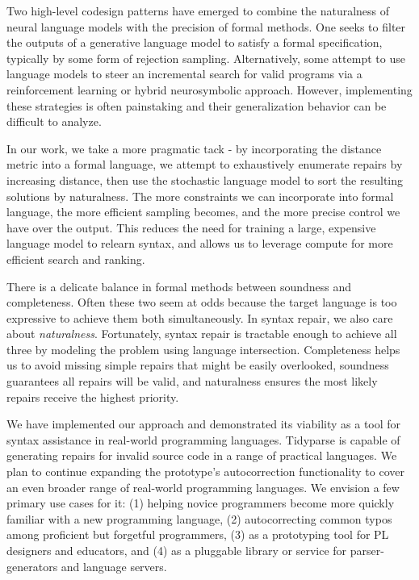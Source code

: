 \documentclass[sigplan,review,acmsmall,nonacm,screen,anonymous]{acmart}\settopmatter{printfolios=false,printccs=false,printacmref=false}
\begin{document}
Two high-level codesign patterns have emerged to combine the naturalness of neural language models with the precision of formal methods. One seeks to filter the outputs of a generative language model to satisfy a formal specification, typically by some form of rejection sampling. Alternatively, some attempt to use language models to steer an incremental search for valid programs via a reinforcement learning or hybrid neurosymbolic approach. However, implementing these strategies is often painstaking and their generalization behavior can be difficult to analyze.

In our work, we take a more pragmatic tack - by incorporating the distance metric into a formal language, we attempt to exhaustively enumerate repairs by increasing distance, then use the stochastic language model to sort the resulting solutions by naturalness. The more constraints we can incorporate into formal language, the more efficient sampling becomes, and the more precise control we have over the output. This reduces the need for training a large, expensive language model to relearn syntax, and allows us to leverage compute for more efficient search and ranking.

There is a delicate balance in formal methods between soundness and completeness. Often these two seem at odds because the target language is too expressive to achieve them both simultaneously. In syntax repair, we also care about \textit{naturalness}. Fortunately, syntax repair is tractable enough to achieve all three by modeling the problem using language intersection. Completeness helps us to avoid missing simple repairs that might be easily overlooked, soundness guarantees all repairs will be valid, and naturalness ensures the most likely repairs receive the highest priority.

We have implemented our approach and demonstrated its viability as a tool for syntax assistance in real-world programming languages. Tidyparse is capable of generating repairs for invalid source code in a range of practical languages. We plan to continue expanding the prototype's autocorrection functionality to cover an even broader range of real-world programming languages. We envision a few primary use cases for it: (1) helping novice programmers become more quickly familiar with a new programming language, (2) autocorrecting common typos among proficient but forgetful programmers, (3) as a prototyping tool for PL designers and educators, and (4) as a pluggable library or service for parser-generators and language servers.
\end{document}
